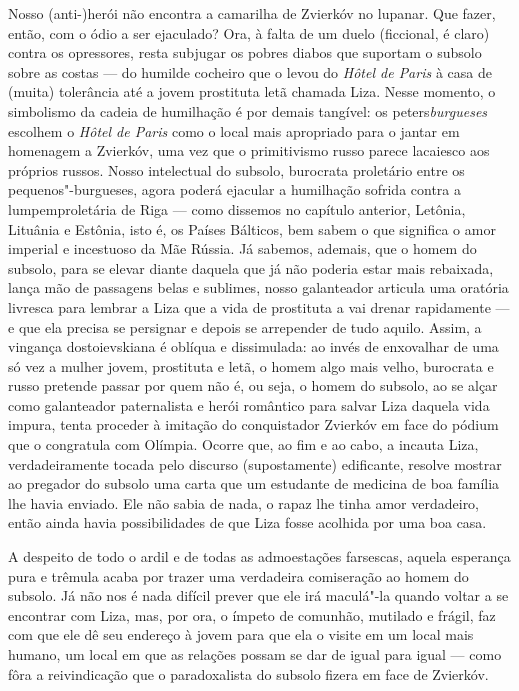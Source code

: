 Nosso \mbox{(anti-)herói} não encontra a camarilha de Zvierkóv no lupanar. Que
fazer, então, com o ódio a ser ejaculado? Ora, à falta de um duelo
(ficcional, é claro) contra os opressores, resta subjugar os pobres
diabos que suportam o subsolo sobre as costas --- do humilde cocheiro que
o levou do \emph{Hôtel de Paris} à casa de (muita) tolerância até a
jovem prostituta letã chamada Liza. Nesse momento, o simbolismo da
cadeia de humilhação é por demais tangível: os peters\emph{burgueses}
escolhem o \emph{Hôtel de Paris} como o local mais apropriado para o
jantar em homenagem a Zvierkóv, uma vez que o primitivismo russo parece
lacaiesco aos próprios russos. Nosso intelectual do subsolo, burocrata
proletário entre os pequenos"-burgueses, agora poderá ejacular a
humilhação sofrida contra a lumpemproletária de Riga --- como dissemos no
capítulo anterior, Letônia, Lituânia e Estônia, isto é, os Países
Bálticos, bem sabem o que significa o amor imperial e incestuoso da Mãe
Rússia. Já sabemos, ademais, que o homem do subsolo, para se elevar
diante daquela que já não poderia estar mais rebaixada, lança mão de
passagens belas e sublimes, nosso galanteador articula uma oratória
livresca para lembrar a Liza que a vida de prostituta a vai drenar
rapidamente --- e que ela precisa se persignar e depois se arrepender de
tudo aquilo. Assim, a vingança dostoievskiana é oblíqua e dissimulada:
ao invés de enxovalhar de uma só vez a mulher jovem, prostituta e letã,
o homem algo mais velho, burocrata e russo pretende passar por quem não
é, ou seja, o homem do subsolo, ao se alçar como galanteador
paternalista e herói romântico para salvar Liza daquela vida impura,
tenta proceder à imitação do conquistador Zvierkóv em face do pódium que
o congratula com Olímpia. Ocorre que, ao fim e ao cabo, a incauta Liza,
verdadeiramente tocada pelo discurso (supostamente) edificante, resolve
mostrar ao pregador do subsolo uma carta que um estudante de medicina de
boa família lhe havia enviado. Ele não sabia de nada, o rapaz lhe tinha
amor verdadeiro, então ainda havia possibilidades de que Liza fosse
acolhida por uma boa casa.

A despeito de todo o ardil e de todas as admoestações farsescas, aquela
esperança pura e trêmula acaba por trazer uma verdadeira comiseração ao
homem do subsolo. Já não nos é nada difícil prever que ele irá maculá"-la
quando voltar a se encontrar com Liza, mas, por ora, o ímpeto de
comunhão, mutilado e frágil, faz com que ele dê seu endereço à jovem
para que ela o visite em um local mais humano, um local em que as
relações possam se dar de igual para igual --- como fôra a reivindicação
que o paradoxalista do subsolo fizera em face de Zvierkóv.

